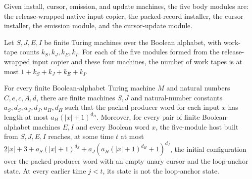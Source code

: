 \begin{definition}
\label{Complexity.clA5Modules}
\leanok
{}
Given install, cursor, emission, and update machines, the five body modules are: the release-wrapped native input copier, the packed-record installer, the cursor installer, the emission module, and the cursor-update module.
\end{definition}

\begin{lemma}
\label{Complexity.clA5Modules_bound}
\leanok
{}
Let $S,J,E,I$ be finite Turing machines over the Boolean alphabet, with work-tape counts
$k_S,k_J,k_E,k_I$. For each of the five modules formed from the release-wrapped input
copier and these four machines, the number of work tapes is at most $1+k_S+k_J+k_E+k_I$.
\end{lemma}

\begin{lemma}
\label{Complexity.clA5Startup}
\leanok
{}
For every finite Boolean-alphabet Turing machine $M$ and natural numbers $C,e,c,A,d$,
there are finite machines $S,J$ and natural-number constants $a_S,d_S,a_J,d_J,a_H,d_H$
such that the packed producer word for each input $x$ has length at most
$a_H(|x|+1)^{d_H}$. Moreover, for every pair of finite Boolean-alphabet machines $E,I$
and every Boolean word $x$, the five-module host built from $S,J,E,I$ reaches, at some
time $t$ at most $2|x|+3+a_S(|x|+1)^{d_S}+a_J(a_H(|x|+1)^{d_H}+1)^{d_J}$, the initial
configuration over the packed producer word with an empty unary cursor and the
loop-anchor state. At every earlier time $j<t$, its state is not the loop-anchor state.
\end{lemma}

